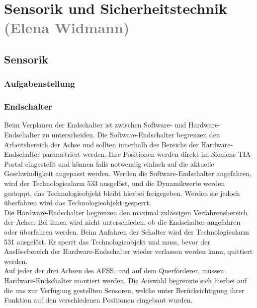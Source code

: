 \section{Sensorik und Sicherheitstechnik \textcolor{gray}{(Elena Widmann)}}
\label{sec:Sensorik und Sicherheitstechnik}

\subsection{Sensorik}
\label{sec:Sensorik}
\subsubsection{Aufgabenstellung}

\subsubsection{Endschalter}
Beim Verplanen der Endschalter ist zwischen Software- und Hardware-Endschalter zu unterscheiden. Die Software-Endschalter begrenzen den Arbeitsbereich der Achse und sollten innerhalb des Bereichs der Hardware-Endschalter parametriert werden. Ihre Positionen werden direkt im Siemens TIA-Portal eingestellt und können falls notwendig einfach auf die aktuelle Geschwindigkeit angepasst werden. Werden die Software-Endschalter angefahren, wird der Technologiealarm 533 ausgelöst, und die Dynamikwerte werden gestoppt, das Technologieobjekt bleibt hierbei freigegeben. Werden sie jedoch überfahren wird das Technologieobjekt gesperrt. \\
Die Hardware-Endschalter begrenzen den maximal zulässigen Verfahrensbereich der Achse. Bei ihnen wird nicht unterschieden, ob die Endschalter angefahren oder überfahren werden. Beim Anfahren der Schalter wird der Technologiealarm 531 ausgelöst. Er sperrt das Technologieobjekt und muss, bevor der Auslösebereich der Hardware-Endschalter wieder verlassen werden kann, quittiert werden. \cite{axis_manual}\\
Auf jeder der drei Achsen des AFSS, und auf dem Querförderer, müssen Hardware-Endschalter montiert werden. Die Auswahl begrenzte sich hierbei auf die uns zur Verfügung gestellten Sensoren, welche unter Berücksichtigung ihrer Funktion auf den verschiedenen Positionen eingebaut wurden.

